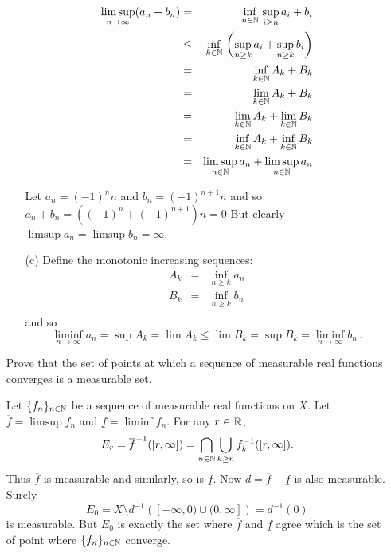 \begin{enumerate}
\begin{itemize}
 \begin{eqnarray*}
   \limsup_{n\to \infty} (a_n + b_n)
   &=& \inf_{n\in\mathbb{N}}\, \sup_{i\geq n} a_i+b_i \\
   &\leq& \inf_{k\in\mathbb{N}}\,   \left(\sup_{n\geq k} a_i
                          +       \sup_{n\geq k} b_i\right) \\
   &=& \inf_{k\in\mathbb{N}} A_k + B_k \\
   &=& \lim_{k\in\mathbb{N}} A_k + B_k \\
   &=& \lim_{k\in\mathbb{N}} A_k + \lim_{k\in\mathbb{N}} B_k \\
   &=& \inf_{k\in\mathbb{N}} A_k + \inf_{k\in\mathbb{N}} B_k \\
   &=& \limsup_{n\in\mathbb{N}} a_n + \limsup_{n\in\mathbb{N}} a_n
 \end{eqnarray*}

  Let \(a_n = (-1)^n n\) and \(b_n = (-1)^{n+1} n\) and
  so
  \(a_n+b_n = ((-1)^n + (-1)^{n+1}) n = 0\)
  But clearly \(\limsup a_n = \limsup b_n = \infty\).

 \item[(c)]
  Define the monotonic increasing sequences:
  \begin{eqnarray*}
  A_k &=& \inf_{n\geq k} a_n  \\
  B_k &=& \inf_{n\geq k} b_n  \\
  \end{eqnarray*}
  and so
  \begin{equation*}
  \liminf_{n\to\infty} a_n = \sup A_k = \lim A_k
      \leq \lim B_k = \sup B_k = \liminf_{n\to\infty} b_n\,.
  \end{equation*}

\end{itemize}

\begin{excopy}
Prove that the set of points at which a sequence of measurable
real functions converges is a measurable set.
\end{excopy}

Let \(\{f_n\}_{n\in\mathbb{N}}\) be a sequence of measurable real functions on $X$.
Let \(\overline{f} = \limsup f_n\)
and \(\underline{f} = \liminf f_n\).
For any \(r\in \mathbb{R}\),
\begin{equation*}
E_r = \overline{f}^{-1}([r,\infty])
 = \bigcap_{n\in\mathbb{N}} \bigcup_{k\geq n} f_k^{-1}([r,\infty]).
\end{equation*}
Thus \(\overline{f}\) is measurable and similarly, so is \(\underline{f}\).
Now \(d = \overline{f} - \underline{f}\) is also measurable.
Surely
\begin{equation*}
E_0 = X \setminus d^{-1}\left([-\infty,0)\cup(0,\infty]\right) = d^{-1}(0)
\end{equation*}
is measurable. But \(E_0\) is exactly the set where
\(\overline{f}\) and \(\underline{f}\) agree
which is the set of point where \(\{f_n\}_{n\in\mathbb{N}}\) converge.



\end{enumerate}
